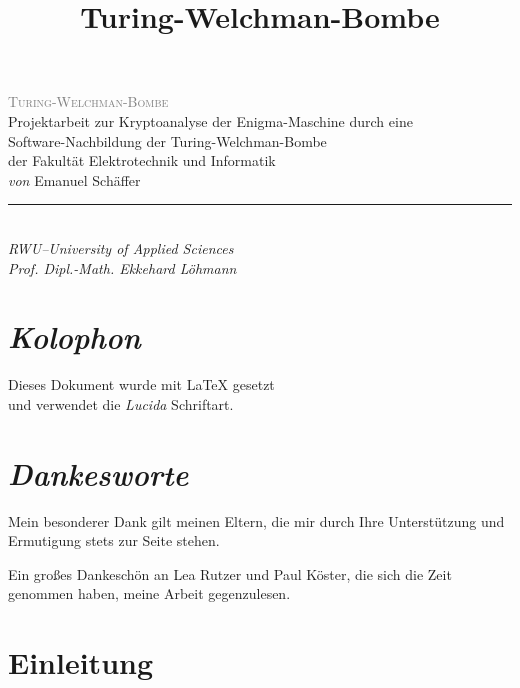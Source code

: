 \documentclass[ngerman, a4paper, justified, nobib, notoc, sfsidenotes]{tufte-book}
\title{Turing-Welchman-Bombe}
\begin{document}
	
	\begin{fullwidth}
		\begin{center}
			\garamondfont
			\thispagestyle{empty}
			\vspace*{3cm}
			{\huge\scshape\textcolor{gray}{Turing-Welchman-Bombe\\}}
			\vspace{5cm}
			\large
			Projektarbeit zur Kryptoanalyse der Enigma-Maschine durch eine\\ 
			Software-Nachbildung der Turing-Welchman-Bombe\\
			der Fakultät Elektrotechnik und Informatik\\
			\vspace{2cm}
			\textit{von} Emanuel Schäffer 
			\hspace{0.4cm} \textcolor{gray}{\rule[-.2em]{0.6pt}{1.2em}} \hspace{0.4cm} 
			\DTMtoday\\
			\vspace{2cm}
			\vfill
			\textsl{RWU--University of Applied Sciences\\Prof. Dipl.-Math. Ekkehard Löhmann}
			\normalsize
		\end{center}
	\end{fullwidth}
	
	\frontmatter
	\fontsize{8.5}{11.7}\selectfont

	\chapter*{\textit{Kolophon}}
	Dieses Dokument wurde mit \LaTeX{} gesetzt\\ und verwendet die \textsl{Lucida} Schriftart.
	
	\chapter*{\textit{Dankesworte}}
	Mein besonderer Dank gilt meinen Eltern, die mir durch Ihre Unterstützung und Ermutigung stets zur Seite stehen.
	
	Ein großes Dankeschön an Lea Rutzer und Paul Köster, die sich die Zeit genommen haben, meine Arbeit gegenzulesen.
	
	\clearpage
	\begin{fullwidth}
		\tableofcontents
	\end{fullwidth}
	
	\chapter*{Einleitung}\label{ch:einleitung}
\end{document}

